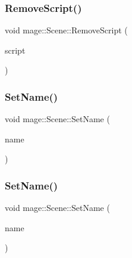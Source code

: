 \hypertarget{classmage_1_1_scene_a82705ba56543dea410439760b1667bc5}{}\label{classmage_1_1_scene_a82705ba56543dea410439760b1667bc5} 
\subsubsection{\texorpdfstring{Remove\+Script()}{RemoveScript()}}
{\footnotesize\ttfamily void mage\+::\+Scene\+::\+Remove\+Script (\begin{DoxyParamCaption}\item[{\hyperlink{namespacemage_a1e01ae66713838a7a67d30e44c67703e}{Shared\+Ptr}$<$ \hyperlink{classmage_1_1_behavior_script}{Behavior\+Script} $>$}]{script }\end{DoxyParamCaption})}

\hypertarget{classmage_1_1_scene_a9b7c1c2f84cc3b3c5ff3de4f29d830e9}{}\label{classmage_1_1_scene_a9b7c1c2f84cc3b3c5ff3de4f29d830e9} 
\subsubsection{\texorpdfstring{Set\+Name()}{SetName()}\hspace{0.1cm}{\footnotesize\ttfamily [1/2]}}
{\footnotesize\ttfamily void mage\+::\+Scene\+::\+Set\+Name (\begin{DoxyParamCaption}\item[{const string \&}]{name }\end{DoxyParamCaption})}

\hypertarget{classmage_1_1_scene_a86b2e6e764ee134af1706f90603a6596}{}\label{classmage_1_1_scene_a86b2e6e764ee134af1706f90603a6596} 
\subsubsection{\texorpdfstring{Set\+Name()}{SetName()}\hspace{0.1cm}{\footnotesize\ttfamily [2/2]}}
{\footnotesize\ttfamily void mage\+::\+Scene\+::\+Set\+Name (\begin{DoxyParamCaption}\item[{string \&\&}]{name }\end{DoxyParamCaption})\hspace{0.3cm}{\ttfamily [noexcept]}}

